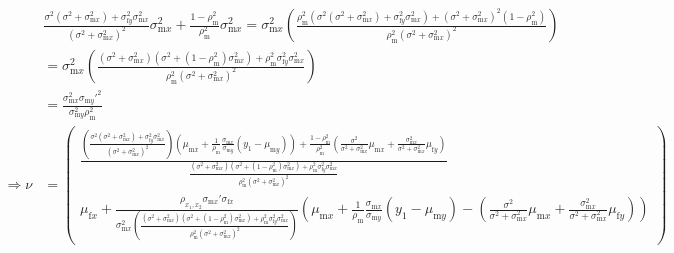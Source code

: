 \documentclass{article}
\newcommand{\x}[1]{\text{#1}}
\begin{document}
\begin{landscape}
\begin{align*}
&\frac{\sigma^2(\sigma^2+\sigma_{\x{m}x}^2)+\sigma_{\x{f}y}^2\sigma_{\x{m}x}^2}{(\sigma^2+\sigma_{\x{m}x}^2)^2}\sigma_{\x{m}x}^2+\frac{1-\rho_\x{m}^2}{\rho_\x{m}^2}\sigma_{\x{m}x}^2=\sigma_{\x{m}x}^2\left(\frac{\rho_\x{m}^2(\sigma^2(\sigma^2+\sigma_{\x{m}x}^2)+\sigma_{\x{f}y}^2\sigma_{\x{m}x}^2)+(\sigma^2+\sigma_{\x{m}x}^2)^2(1-\rho_\x{m}^2)}{\rho_\x{m}^2(\sigma^2+\sigma_{\x{m}x}^2)^2} \right)
\\&=\sigma_{\x{m}x}^2\left(\frac{(\sigma^2+\sigma_{\x{m}x}^2)(\sigma^2+(1-\rho_\x{m}^2)\sigma_{\x{m}x}^2)+\rho_\x{m}^2\sigma_{\x{f}y}^2\sigma_{\x{m}x}^2}{\rho_\x{m}^2(\sigma^2+\sigma_{\x{m}x}^2)^2}\right)
\\&=\frac{\sigma_{\x{m}x}^2\sigma_{\x{m}y}'^2}{\sigma_{\x{m}y}^2\rho_\x{m}^2}
\\ \Rightarrow \nu&=\left(\begin{array}{cc}\frac{\left(\frac{\sigma^2(\sigma^2+\sigma_{\x{m}x}^2)+\sigma_{\x{f}y}^2\sigma_{\x{m}x}^2}{(\sigma^2+\sigma_{\x{m}x}^2)^2}\right)\left(\mu_{\x{m}x}+\frac{1}{\rho_\x{m}}\frac{\sigma_{\x{m}x}}{\sigma_{\x{m}y}}(y_1-\mu_{\x{m}y})\right)+\frac{1-\rho_\x{m}^2}{\rho_\x{m}^2}\left(\frac{\sigma^2}{\sigma^2+\sigma_{\x{m}x}^2}\mu_{\x{m}x}+\frac{\sigma_{\x{m}x}^2}{\sigma^2+\sigma_{\x{m}x}^2}\mu_{\x{f}y}\right)}{\frac{(\sigma^2+\sigma_{\x{m}x}^2)(\sigma^2+(1-\rho_\x{m}^2)\sigma_{\x{m}x}^2)+\rho_\x{m}^2\sigma_{\x{f}y}^2\sigma_{\x{m}x}^2}{\rho_\x{m}^2(\sigma^2+\sigma_{\x{m}x}^2)^2}} \\ \mu_{\x{f}x}+\frac{\rho_{x_1,x_2}\sigma_{\x{m}x}'\sigma_{\x{f}x}}{\sigma_{\x{m}x}^2\left(\frac{(\sigma^2+\sigma_{\x{m}x}^2)(\sigma^2+(1-\rho_\x{m}^2)\sigma_{\x{m}x}^2)+\rho_\x{m}^2\sigma_{\x{f}y}^2\sigma_{\x{m}x}^2}{\rho_\x{m}^2(\sigma^2+\sigma_{\x{m}x}^2)^2}\right)}\left(\mu_{\x{m}x}+\frac{1}{\rho_\x{m}}\frac{\sigma_{\x{m}x}}{\sigma_{\x{m}y}}(y_1-\mu_{\x{m}y})-\left(\frac{\sigma^2}{\sigma^2+\sigma_{\x{m}x}^2}\mu_{\x{m}x}+\frac{\sigma_{\x{m}x}^2}{\sigma^2+\sigma_{\x{m}x}^2}\mu_{\x{f}y}\right)\right) \end{array}\right)

\end{align*}
\end{landscape}
\end{document}
